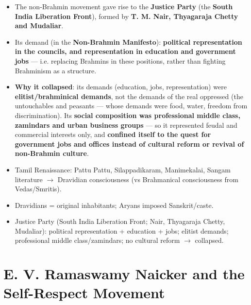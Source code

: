 \begin{KeyConcept}
\begin{itemize}
\item The non-Brahmin movement gave rise to the \textbf{Justice Party} (the \textbf{South India Liberation Front}), formed by \textbf{T. M. Nair, Thyagaraja Chetty and Mudaliar}.
\item Its demand (in the \textbf{Non-Brahmin Manifesto}): \textbf{political representation in the councils, and representation in education and government jobs} --- i.e. replacing Brahmins in these positions, rather than fighting Brahminism as a structure.
\item \textbf{Why it collapsed}: its demands (education, jobs, representation) were \textbf{elitist/brahminical demands}, not the demands of the real oppressed (the untouchables and peasants --- whose demands were food, water, freedom from discrimination). Its \textbf{social composition was professional middle class, zamindars and urban business groups} --- so it represented feudal and commercial interests only, and \textbf{confined itself to the quest for government jobs and offices instead of cultural reform or revival of non-Brahmin culture}.
\end{itemize}
\end{KeyConcept}

\begin{QuickRevision}
\begin{itemize}
\item Tamil Renaissance: Pattu Pattu, Silappadikaram, Manimekalai, Sangam literature $\rightarrow$ Dravidian consciousness (vs Brahmanical consciousness from Vedas/Smritis).
\item Dravidians = original inhabitants; Aryans imposed Sanskrit/caste.
\item Justice Party (South India Liberation Front; Nair, Thyagaraja Chetty, Mudaliar): political representation + education + jobs; elitist demands; professional middle class/zamindars; no cultural reform $\rightarrow$ collapsed.
\end{itemize}
\end{QuickRevision}

\section{E. V. Ramaswamy Naicker and the Self-Respect Movement}

